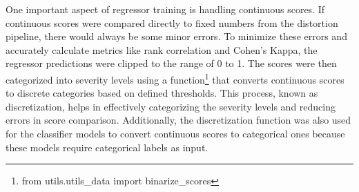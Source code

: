 \noindent
One important aspect of regressor training is handling continuous scores. If continuous scores were compared directly to fixed numbers from the distortion pipeline, there would always be some minor errors. To minimize these errors and accurately calculate metrics like rank correlation and Cohen’s Kappa, the regressor predictions were clipped to the range of 0 to 1. The scores were then categorized into severity levels using a function\footnote{from utils.utils\_data import binarize\_scores} that converts continuous scores to discrete categories based on defined thresholds. This process, known as discretization, helps in effectively categorizing the severity levels and reducing errors in score comparison. Additionally, the discretization function was also used for the classifier models to convert continuous scores to categorical ones because these models require categorical labels as input. \par

